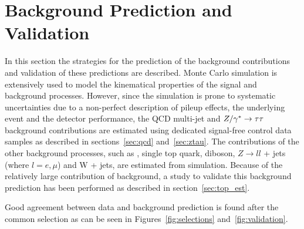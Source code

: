 \section{Background Prediction and Validation}
\label{sec:BackgroundEstimation}

In this section the strategies for  the prediction of the background contributions and validation of these predictions are described.
Monte Carlo  simulation is extensively used to model the kinematical properties of the signal and background processes.
However, since the  simulation is prone to systematic
uncertainties due to a non-perfect description of pileup effects, the
underlying event and the detector performance, the  QCD multi-jet and $Z/\gamma^*\rightarrow \tau\tau$ 
background contributions are estimated using dedicated signal-free control data samples 
as described  in sections~\ref{sec:qcd} and~\ref{sec:ztau}.
The contributions of the other background processes, such as \ttbar, single top quark, diboson, $Z
\rightarrow ll$ + jets (where $l = e,\mu$) and W + jets, are estimated
from simulation. Because of  the relatively large contribution of \ttbar background, a study to validate
this background prediction has been performed as described in section~\ref{sec:top_est}.

Good agreement between data and background prediction is found after the common selection as can be seen in 
Figures~\ref{fig:selections} and~\ref{fig:validation}.


